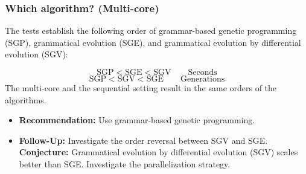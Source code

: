 \begin{frame}
\frametitle{
Which algorithm? (Multi-core)
}
\scriptsize 
The tests establish the following order of grammar-based genetic programming (SGP), 
grammatical evolution (SGE), and grammatical evolution by differential evolution (SGV):
 
\begin{displaymath}
\mbox{SGP} < \mbox{SGE} < \mbox{SGV} \quad\quad \mbox{Seconds}
\end{displaymath}
\begin{displaymath}
\mbox{SGP} < \mbox{SGV} < \mbox{SGE} \quad\quad \mbox{Generations}
\end{displaymath}
The multi-core and the sequential setting result in the same orders of the algorithms.
 
\vspace{2mm} 
\begin{itemize}
\item {\bf Recommendation:} Use grammar-based genetic programming.
\item {\bf Follow-Up:} Investigate the order reversal between SGV and SGE.
 {\bf Conjecture:} Grammatical evolution by differential evolution (SGV) scales better than SGE.
 Investigate the parallelization strategy.
\end{itemize}
\end{frame}